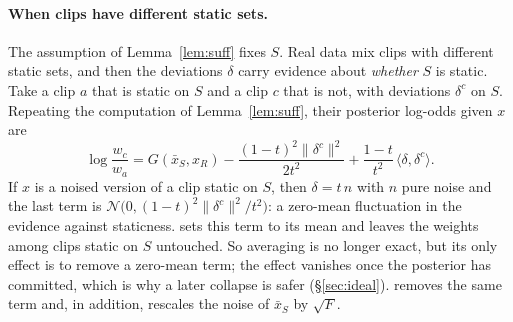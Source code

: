 \paragraph{When clips have different static sets.}
The assumption of Lemma~\ref{lem:suff} fixes $S$.
Real data mix clips with different static sets, and then the deviations $\delta$ carry evidence about \emph{whether} $S$ is static.
Take a clip $a$ that is static on $S$ and a clip $c$ that is not, with deviations $\delta^{c}$ on $S$.
Repeating the computation of Lemma~\ref{lem:suff}, their posterior log-odds given $x$ are
\begin{equation}
\log\frac{w_c}{w_a}=G(\bar x_S,x_R)-\frac{(1-t)^2\|\delta^{c}\|^2}{2t^2}+\frac{1-t}{t^2}\,\langle\delta,\delta^{c}\rangle .
\label{eq:mixture}
\end{equation}
If $x$ is a noised version of a clip static on $S$, then $\delta=t\,n$ with $n$ pure noise and the last term is $\mathcal{N}\!\big(0,(1-t)^2\|\delta^{c}\|^2/t^2\big)$: a zero-mean fluctuation in the evidence against staticness.
\Mean{} sets this term to its mean and leaves the weights among clips static on $S$ untouched.
So averaging is no longer exact, but its only effect is to remove a zero-mean term; the effect vanishes once the posterior has committed, which is why a later collapse is safer (\S\ref{sec:ideal}).
\Copy{} removes the same term and, in addition, rescales the noise of $\bar x_S$ by $\sqrt F$.
